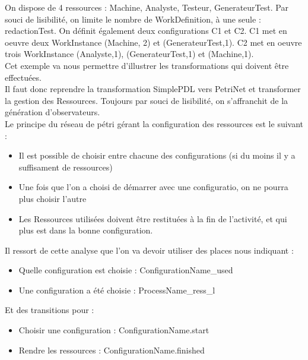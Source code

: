 On dispose de 4 ressources : Machine, Analyste, Testeur, GenerateurTest.
Par souci de lisibilité, on limite le nombre de WorkDefinition, à une seule : redactionTest. On définit également deux configurations C1 et C2. C1 met en oeuvre deux WorkInstance (Machine, 2) et (GenerateurTest,1). C2 met en oeuvre trois WorkInstance (Analyste,1), (GenerateurTest,1) et (Machine,1).\\

Cet exemple va nous permettre d'illustrer les transformations qui doivent être effectuées.\\

Il faut donc reprendre la transformation SimplePDL vers PetriNet et transformer la gestion des Ressources. Toujours par souci de lisibilité, on s'affranchit de la génération d'observateurs.\\

Le principe du réseau de pétri gérant la configuration des ressources est le suivant :\\

\begin{itemize}
\item Il est possible de choisir entre chacune des configurations (si du moins il y a suffisament de ressources)
\item Une fois que l'on a choisi de démarrer avec une configuratio, on ne pourra plus choisir l'autre
\item Les Ressources utilisées doivent être restituées à la fin de l'activité, et qui plus est dans la bonne configuration.
\end{itemize}

Il ressort de cette analyse que l'on va devoir utiliser des places nous indiquant :\\

\begin{itemize}
\item Quelle configuration est choisie : ConfigurationName\_used
\item Une configuration a été choisie : ProcessName\_ress\_l\\
\end{itemize}

Et des transitions pour :\\

\begin{itemize}
\item Choisir une configuration : ConfigurationName.start
\item Rendre les ressources : ConfigurationName.finished\\
\end{itemize}

